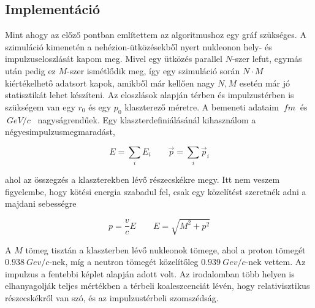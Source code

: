 \documentclass[a4paper,12pt]{article}
\begin{document}
\vspace{5mm}

\subsection{ Implementáció}

\par Mint ahogy az előző pontban említettem az algoritmushoz egy gráf szükséges. A szimuláció kimenetén a nehézion-ütközésekből nyert nukleonon hely- és impulzuseloszlását kapom meg. Mivel egy ütközés parallel $N$-szer lefut, egymás után pedig ez $M$-szer ismétlődik meg, így egy szimuláció során $N\cdot M$ kiértékelhető adatsort kapok, amikből már kellően nagy $N, M$ esetén már jó statisztikát lehet készíteni. Az eloszlások alapján térben és impulzustérben is szükségem van egy $r_{0}$ és egy $p_{0}$ klaszterező méretre. A bemeneti adataim $~fm~$ és $~GeV/c$~ nagyságrendűek. Egy klaszterdefiniálásánál kihasználom a négyesimpulzusmegmaradást, 

\vspace{5mm}

\begin{equation}
	E = \sum_{i} E_{i} \quad \quad \vec{p} = \sum_{i} \vec{p}_{i}
\end{equation} 

\vspace{5mm}

\par ahol az összegzés a klaszterekben lévő részecskékre megy. Itt nem veszem figyelembe, hogy kötési energia szabadul fel, csak egy közelítést szeretnék adni a majdani sebességre

\vspace{5mm}

\begin{equation}
	p = \frac{v}{c} E \quad \quad E = \sqrt{M^{2} + p^{2}}
\end{equation}

\vspace{5mm}

\par A $M$ tömeg tisztán a klaszterben lévő nukleonok tömege, ahol a proton tömegét $0.938 ~Gev/c$-nek, míg a neutron tömegét közelítőleg $0.939 ~Gev/c$-nek vettem. Az impulzus a fentebbi képlet alapján adott volt. Az irodalomban több helyen is elhanyagolják teljes mértékben a térbeli koaleszcenciát lévén, hogy relativisztikus részecskékről van szó, és az impulzustérbeli szomszédság. 

\vspace{5mm}
\end{document}
